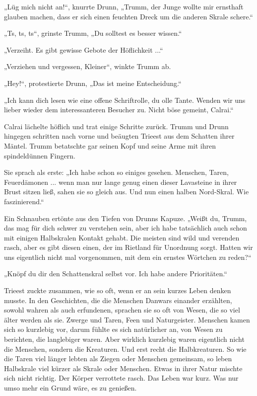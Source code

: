 „Lüg mich nicht an!“, knurrte Drunn, „Trumm, der Junge wollte mir ernsthaft glauben machen, dass er sich einen feuchten Dreck um die anderen Skrale schere.“

„Ts, ts, ts“, grinste Trumm, „Du solltest es besser wissen.“

„Verzeiht. Es gibt gewisse Gebote der Höflichkeit ...“

„Verziehen und vergessen, Kleiner“, winkte Trumm ab.

„Hey!“, protestierte Drunn, „Das ist meine Entscheidung.“

„Ich kann dich lesen wie eine offene Schriftrolle, du olle Tante. Wenden wir uns lieber wieder dem interessanteren Besucher zu. Nicht böse gemeint, Calrai.“

Calrai lächelte höflich und trat einige Schritte zurück. Trumm und Drunn hingegen schritten nach vorne und beäugten Trieest aus dem Schatten ihrer Mäntel. Trumm betatschte gar seinen Kopf und seine Arme mit ihren spindeldünnen Fingern.

Sie sprach als erste: „Ich habe schon so einiges gesehen. Menschen, Taren, Feuerdämonen ... wenn man nur lange genug einen dieser Lavasteine in ihrer Brust sitzen ließ, sahen sie so gleich aus. Und nun einen halben Nord-Skral. Wie faszinierend.“

Ein Schnauben ertönte aus den Tiefen von Drunns Kapuze. „Weißt du, Trumm, das mag für dich schwer zu verstehen sein, aber ich habe tatsächlich auch schon mit einigen Halbskralen Kontakt gehabt. Die meisten sind wild und verenden rasch, aber es gibt diesen einen, der im Rietland für Unordnung sorgt. Hatten wir uns eigentlich nicht mal vorgenommen, mit dem ein ernstes Wörtchen zu reden?“

„Knöpf du dir den Schattenskral selbst vor. Ich habe andere Prioritäten.“

Trieest zuckte zusammen, wie so oft, wenn er an sein kurzes Leben denken musste. In den Geschichten, die die Menschen Danwars einander erzählten, sowohl wahren als auch erfundenen, sprachen sie so oft von Wesen, die so viel älter werden als sie. Zwerge und Taren, Feen und Naturgeister. Menschen kamen sich so kurzlebig vor, darum fühlte es sich natürlicher an, von Wesen zu berichten, die langlebiger waren. Aber wirklich kurzlebig waren eigentlich nicht die Menschen, sondern die Kreaturen. Und erst recht die Halbkreaturen. So wie die Taren viel länger lebten als Ziegen oder Menschen gemeinsam, so leben Halbskrale viel kürzer als Skrale oder Menschen. Etwas in ihrer Natur mischte sich nicht richtig. Der Körper verrottete rasch. Das Leben war kurz. Was nur umso mehr ein Grund wäre, es zu genießen.


